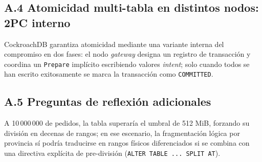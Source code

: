 \documentclass[10pt,letterpaper]{article}
\begin{document}
\subsection*{A.4 Atomicidad multi-tabla en distintos nodos: 2PC interno}
CockroachDB garantiza atomicidad mediante una variante interna del compromiso en dos fases: el nodo \textit{gateway} designa un registro de transacción y coordina un \texttt{Prepare} implícito escribiendo valores \textit{intent}; solo cuando todos se han escrito exitosamente se marca la transacción como \texttt{COMMITTED}.

\subsection*{A.5 Preguntas de reflexión adicionales}
A 10\,000\,000 de pedidos, la tabla superaría el umbral de 512 MiB, forzando su división en decenas de rangos; en ese escenario, la fragmentación lógica por provincia sí podría traducirse en rangos físicos diferenciados si se combina con una directiva explícita de pre-división (\texttt{ALTER TABLE ... SPLIT AT}).



\end{document}
